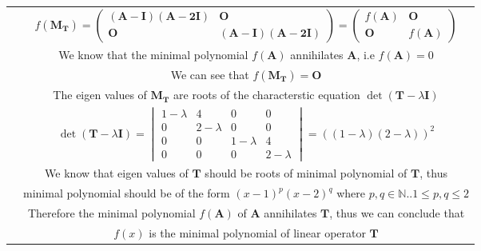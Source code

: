 \documentclass[journal,12pt,twocolumn]{IEEEtran}
\providecommand{\brak}[1]{\ensuremath{\left(#1\right)}}
\newcommand{\myvec}[1]{\ensuremath{\begin{pmatrix}#1\end{pmatrix}}}
\newcommand{\mydet}[1]{\ensuremath{\begin{vmatrix}#1\end{vmatrix}}}
\numberwithin{equation}{subsection}
\let\vec\mathbf
\begin{document}
\begin{table}[h]
\begin{tabular}{|c|c|}
         &$f\brak{\vec{M_T}}=\myvec{\vec{\brak{A-I}\brak{A-2I}}&\vec{O}\\\vec{O}&\vec{\brak{A-I}\brak{A-2I}}}=\myvec{f\brak{\vec{A}}&\vec{O}\\\vec{O}&f\brak{\vec{A}}}$\\
         & We know that the minimal polynomial $f\brak{\vec{A}}$ annihilates $\vec{A}$, i.e $f\brak{\vec{A}}=0$\\
         & We can see that $f\brak{\vec{M_T}}=\vec{O}$\\
         & The eigen values of $\vec{M_T}$ are roots of the characterstic equation $\det \brak{\vec{T}-\lambda\vec{I}}$\\
         &$\det \brak{\vec{T}-\lambda\vec{I}}=\mydet{1-\lambda&4&0&0\\0&2-\lambda&0&0\\0&0&1-\lambda&4\\0&0&0&2-\lambda}=\brak{\brak{1-\lambda}\brak{2-\lambda}}^2$\\
         & We know that eigen values of $\vec{T}$ should be roots of minimal polynomial of $\vec{T}$, thus\\
         & minimal polynomial should be of the form $\brak{x-1}^p\brak{x-2}^q$ where $p,q \in \mathbb{N}.. 1\leq p,q\leq2$\\
         & Therefore the minimal polynomial $f\brak{\vec{A}}$ of $\vec{A}$ annihilates $\vec{T}$, thus we can conclude that\\
         & $f\brak{{x}}$ is the minimal polynomial of linear operator $\vec{T}$\\
    \hline
    \end{tabular}
\end{table}
\end{document}
